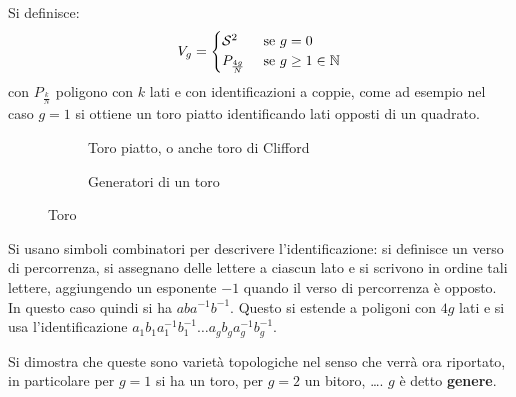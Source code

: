 \begin{example}
  Si definisce:
  \[
    V_g =
    \begin{cases}
      \mathcal{S}^{2} & \text{ se } g = 0 \\
      P_{\frac{4g}{N}} & \text{ se } g \geq 1 \in \mathbb{N}
    \end{cases}
  \]
  con $ P_{\frac{k}{N}} $ poligono con $ k $ lati e con identificazioni a coppie, come
  ad esempio nel caso $ g = 1 $ si ottiene un toro piatto identificando lati opposti
  di un quadrato.
  \begin{figure}[htbp]
    \centering
    \begin{subfigure}[htbp]{.45\linewidth}
      \centering{}
      \caption{Toro piatto, o anche toro di Clifford}
      \label{fig:lez3:clifford_torus}
    \end{subfigure}
    \begin{subfigure}[htbp]{.45\linewidth}
      \centering
      \def\svgwidth{0.9\textwidth}
      
      \caption{Generatori di un toro}
      \label{fig:lez3:torus_generators}
    \end{subfigure}
    \label{fig:lez3:torus}
    \caption{Toro}
  \end{figure}
  Si usano simboli combinatori per descrivere l'identificazione: si definisce un verso di percorrenza, si assegnano delle lettere a ciascun
  lato e si scrivono in ordine tali lettere, aggiungendo un esponente $ -1 $ quando il verso di percorrenza è opposto. In questo caso quindi
  si ha $ aba^{-1}b^{-1} $. Questo si estende a poligoni con $ 4g $ lati e si usa l'identificazione
  $ a_1 b_1 a_1^{-1} b_1^{-1} \dots a_g b_g a_g^{-1} b_g^{-1} $.

  Si dimostra che queste sono varietà topologiche nel senso che verrà ora
  riportato, in particolare per $ g = 1 $ si ha un toro, per $ g = 2 $ un
  bitoro, \dots. $ g $ è detto \textbf{genere}.


\end{example}
